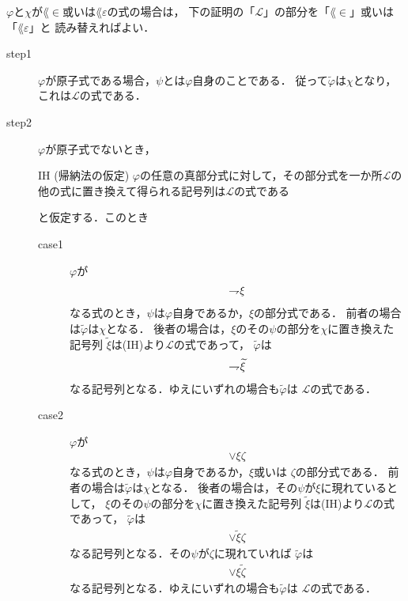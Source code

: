	\begin{metaprf} $\varphi$と$\chi$が$\lang{\in}$或いは$\lang{\varepsilon}$の式の場合は，
		下の証明の「$\mathcal{L}$」の部分を「$\lang{\in}$」或いは「$\lang{\varepsilon}$」と
		読み替えればよい．
		\begin{description}
			\item[step1] $\varphi$が原子式である場合，$\psi$とは$\varphi$自身のことである．
				従って$\widetilde{\varphi}$は$\chi$となり，これは$\mathcal{L}$の式である．
				
			\item[step2] $\varphi$が原子式でないとき，
				\begin{itembox}[l]{IH (帰納法の仮定)}
					$\varphi$の任意の真部分式に対して，その部分式を一か所$\mathcal{L}$の
					他の式に置き換えて得られる記号列は$\mathcal{L}$の式である
				\end{itembox}
				と仮定する．このとき
				\begin{description}
					\item[case1] $\varphi$が
						\begin{align}
							\rightharpoondown\hspace{-0.25em} \xi
						\end{align}
						なる式のとき，$\psi$は$\varphi$自身であるか，$\xi$の部分式である．
						前者の場合は$\widetilde{\varphi}$は$\chi$となる．
						後者の場合は，$\xi$のその$\psi$の部分を$\chi$に置き換えた記号列
						$\widetilde{\xi}$は(IH)より$\mathcal{L}$の式であって，
						$\widetilde{\varphi}$は
						\begin{align}
							\rightharpoondown\hspace{-0.25em} \widetilde{\xi}
						\end{align}
						なる記号列となる．ゆえにいずれの場合も$\widetilde{\varphi}$は
						$\mathcal{L}$の式である．
					
					\item[case2] $\varphi$が
						\begin{align}
							\vee \xi \zeta
						\end{align}
						なる式のとき，$\psi$は$\varphi$自身であるか，$\xi$或いは
						$\zeta$の部分式である．
						前者の場合は$\widetilde{\varphi}$は$\chi$となる．
						後者の場合は，その$\psi$が$\xi$に現れているとして，
						$\xi$のその$\psi$の部分を$\chi$に置き換えた記号列
						$\widetilde{\xi}$は(IH)より$\mathcal{L}$の式であって，
						$\widetilde{\varphi}$は
						\begin{align}
							\vee \widetilde{\xi} \zeta
						\end{align}
						なる記号列となる．その$\psi$が$\zeta$に現れていれば
						$\widetilde{\varphi}$は
						\begin{align}
							\vee \xi \widetilde{\zeta}
						\end{align}
						なる記号列となる．ゆえにいずれの場合も$\widetilde{\varphi}$は
						$\mathcal{L}$の式である．
						

\end{description}
\end{description}
\end{metaprf}
